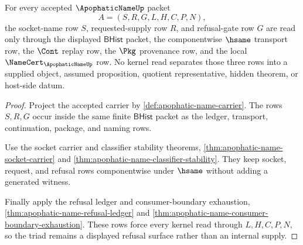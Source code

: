 \begin{theorem}
\label{thm:apophatic-name-kernel-scope-triad}
For every accepted $\ApophaticNameUp$ packet
$$
A=(S,R,G,L,H,C,P,N),
$$
the socket-name row $S$, requested-supply row $R$, and refusal-gate row $G$ are read only through the displayed $\mathsf{BHist}$ packet, the componentwise $\hsame$ transport row, the $\Cont$ replay row, the $\Pkg$ provenance row, and the local $\NameCert_{\ApophaticNameUp}$ row. No kernel read separates those three rows into a supplied object, assumed proposition, quotient representative, hidden theorem, or host-side datum.
\end{theorem}
\begin{proof}
Project the accepted carrier by \autoref{def:apophatic-name-carrier}. The rows $S,R,G$ occur inside the same finite $\mathsf{BHist}$ packet as the ledger, transport, continuation, package, and naming rows.

Use the socket carrier and classifier stability theorems, \autoref{thm:apophatic-name-socket-carrier} and \autoref{thm:apophatic-name-classifier-stability}. They keep socket, request, and refusal rows componentwise under $\hsame$ without adding a generated witness.

Finally apply the refusal ledger and consumer-boundary exhaustion, \autoref{thm:apophatic-name-refusal-ledger} and \autoref{thm:apophatic-name-consumer-boundary-exhaustion}. These rows force every kernel read through $L,H,C,P,N$, so the triad remains a displayed refusal surface rather than an internal supply.
\end{proof}

